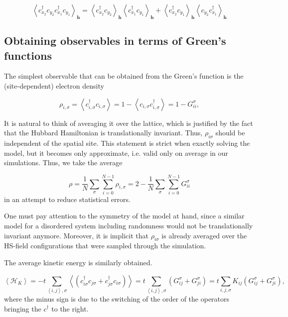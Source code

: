 \begin{equation}
\left\langle c_{x_2}^\dagger c_{y_2} c_{x_1}^\dagger c_{y_1} \right\rangle_{\bm h} = \left\langle c_{x_2}^\dagger c_{y_2} \right\rangle_{\bm h} \left\langle c_{x_1}^\dagger c_{y_1} \right\rangle_{\bm h} + \left\langle c_{x_2}^\dagger c_{y_1} \right\rangle_{\bm h} \left\langle  c_{y_2} c_{x_1}^\dagger \right\rangle_{\bm h}
\end{equation}

\subsection{Obtaining observables in terms of Green's functions}
\label{subsec:observablesGreen}

The simplest observable that can be obtained from the Green's function is the (site-dependent) electron density

\begin{equation}
\rho_{i, \sigma} = \left\langle c_{i,\sigma}^\dagger c_{i,\sigma} \right\rangle = 1 - \left\langle c_{i,\sigma} c_{i,\sigma}^\dagger \right\rangle = 1 - G_{ii}^\sigma ,
\end{equation}

It is natural to think of averaging it over the lattice, which is justified by the fact that the Hubbard Hamiltonian is translationally invariant.
Thus, $\rho_{i\sigma}$ should be independent of the spatial site.
This statement is strict when exactly solving the model, but it becomes only approximate, i.e. valid only on average in our simulations.
Thus, we take the average

\begin{equation}
\rho = \frac{1}{N} \sum_\sigma \sum_{i=0}^{N-1} \rho_{i, \sigma} = 2 - \frac{1}{N} \sum_\sigma \sum_{i=0}^{N-1} G_{ii}^\sigma
\end{equation}
in an attempt to reduce statistical errors.

One must pay attention to the symmetry of the model at hand, since a similar model for a disordered system including randomness would not be translationally invariant anymore.
Moreover, it is implicit that $\rho_{i\sigma}$ is already averaged over the HS-field configurations that were sampled through the simulation.

The average kinetic energy is similarly obtained.

\begin{equation}
\left\langle \mathcal{H}_K \right\rangle = - t  \sum_{\left\langle i, j \right\rangle , \sigma} \left\langle ( c_{i\sigma}^\dagger c_{j\sigma} + c_{j\sigma}^\dagger c_{i\sigma} ) \right\rangle = t \sum_{\left\langle i, j \right\rangle , \sigma} ( G_{ij}^\sigma + G_{ji}^\sigma ) = t \sum_{ i, j , \sigma} K_{ij} ( G_{ij}^\sigma + G_{ji}^\sigma )  ,
\end{equation}
where the minus sign is due to the switching of the order of the operators bringing the $c^\dagger$ to the right.

